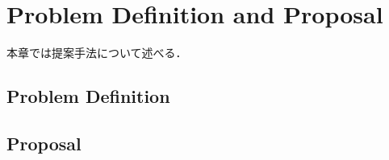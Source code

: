 \chapter{Problem Definition and Proposal}
\label{problem_definition_and_proposal}

本章では提案手法について述べる．

\section{Problem Definition}

\section{Proposal}



